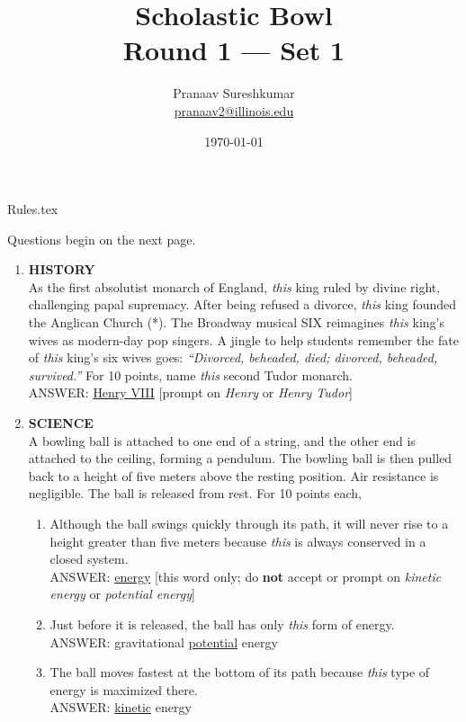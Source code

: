 \documentclass{report}
\title{\textbf{Scholastic Bowl} \\ Round 1 --- Set 1}
\author{Pranaav Sureshkumar \\ \href{mailto:pranaav2@illinois.edu}{pranaav2@illinois.edu}}
\date{\today}
\newcommand*{\backtrack}{\setcounter{enumi}{\numexpr\theenumi-1\relax}}
\begin{document}


\maketitle

{Rules.tex}

\newpage

\vspace*{\fill}
\centering
\thispagestyle{empty}
\Large
Questions begin on the next page.
\vspace*{\fill}

\normalsize
\newpage
\setcounter{page}{1}

\begin{enumerate}

    \item \textbf{HISTORY} \\ As the first absolutist monarch of England, \textit{this} king ruled by divine right, challenging papal supremacy. After being refused a divorce, \textit{this} king founded the Anglican Church (*). The Broadway musical SIX reimagines \textit{this} king’s wives as modern-day pop singers. A jingle to help students remember the fate of \textit{this} king’s six wives goes: \textit{“Divorced, beheaded, died; divorced, beheaded, survived.”} For 10 points, name \textit{this} second Tudor monarch. \\ ANSWER: \underline{Henry VIII} [prompt on \textit{Henry} or \textit{Henry Tudor}] \backtrack
    \item \textbf{SCIENCE} \\ A bowling ball is attached to one end of a string, and the other end is attached to the ceiling, forming a pendulum. The bowling ball is then pulled back to a height of five meters above the resting position. Air resistance is negligible. The ball is released from rest. For 10 points each,
    \begin{enumerate}[label=\Alph*]
        \item Although the ball swings quickly through its path, it will never rise to a height greater than five meters because \textit{this} is always conserved in a closed system. \\ ANSWER: \underline{energy} [this word only; do \textbf{not} accept or prompt on \textit{kinetic energy} or \textit{potential energy}]
        \item Just before it is released, the ball has only \textit{this} form of energy. \\ ANSWER: gravitational \underline{potential} energy
        \item The ball moves fastest at the bottom of its path because \textit{this} type of energy is maximized there. \\ ANSWER: \underline{kinetic} energy
    \end{enumerate}
    

\end{enumerate}
\end{document}
